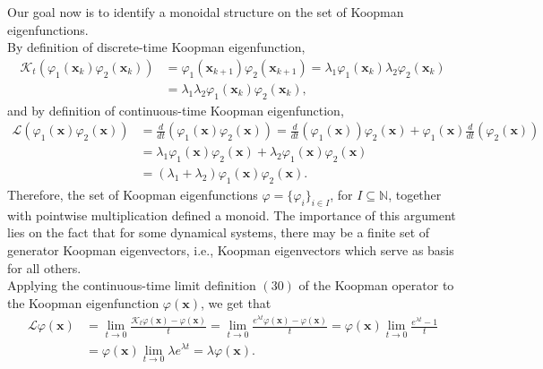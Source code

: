 \documentclass[]{article}
\begin{document}
\noindent Our goal now is to identify a monoidal structure on the set of Koopman eigenfunctions. \\
By definition of discrete-time Koopman eigenfunction,
\begin{equation}
	\begin{split}
		\mathcal{K}_t(\varphi_1(\textbf{x}_k)\varphi_2(\textbf{x}_k)) & = \varphi_1(\textbf{x}_{k+1})\varphi_2(\textbf{x}_{k+1}) = \lambda_1 \varphi_1(\textbf{x}_k) \lambda_2 \varphi_2(\textbf{x}_k) \\ & = \lambda_1 \lambda_2 \varphi_1(\textbf{x}_k)  \varphi_2(\textbf{x}_k),
	\end{split}
\end{equation}
and by definition of continuous-time Koopman eigenfunction,
\begin{equation}
	\begin{split}
		\mathcal{L}(\varphi_1(\textbf{x})\varphi_2(\textbf{x})) & = \frac{d}{dt}(\varphi_1(\textbf{x})\varphi_2(\textbf{x})) = \frac{d}{dt}(\varphi_1(\textbf{x})) \varphi_2(\textbf{x})+\varphi_1(\textbf{x})\frac{d}{dt}(\varphi_2(\textbf{x})) \\ & = \lambda_1\varphi_1(\textbf{x})\varphi_2(\textbf{x})+\lambda_2\varphi_1(\textbf{x})\varphi_2(\textbf{x}) \\ & = (\lambda_1+\lambda_2)\varphi_1(\textbf{x})\varphi_2(\textbf{x}).
	\end{split}
\end{equation}
Therefore, the set of Koopman eigenfunctions $\varphi = \{\varphi_i\}_{i \in I}$, for $I \subseteq \mathbb{N}$, together with pointwise multiplication defined a monoid. The importance of this argument lies on the fact that for some dynamical systems, there may be a finite set of generator Koopman eigenvectors, i.e., Koopman eigenvectors which serve as basis for all others. \\
Applying the continuous-time limit definition $(30)$ of the Koopman operator to the Koopman eigenfunction $\varphi(\textbf{x})$, we get that
\begin{equation}
	\begin{split}
		\mathcal{L}\varphi(\textbf{x}) & = \lim_{t \to 0} \frac{\mathcal{K}_t \varphi(\textbf{x}) - \varphi(\textbf{x})}{t} = \lim_{t \to 0} \frac{e^{\lambda t}\varphi(\textbf{x}) - \varphi(\textbf{x})}{t} = \varphi(\textbf{x}) \lim_{t \to 0} \frac{e^{\lambda t}-1}{t} \\ & = \varphi(\textbf{x})\lim_{t \to 0} \lambda e^{\lambda t} = \lambda \varphi(\textbf{x}).
	\end{split}
\end{equation}
\end{document}
